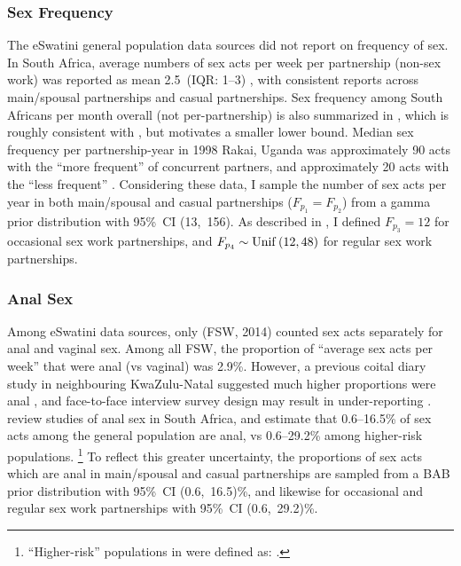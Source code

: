 \subsubsection{Sex Frequency}\label{model.par.sex.freq}
The eSwatini general population data sources \cite{SDHS2006,SHIMS1,SHIMS2}
did not report on frequency of sex. %
In South Africa, average numbers of sex acts per week per partnership (non-sex work)
was reported as mean 2.5~(IQR: 1--3) \cite{Delva2013},
with consistent reports across main/spousal partnerships and casual partnerships.
Sex frequency among South Africans per month overall (not per-partnership)
is also summarized in \cite[Figure~3.15]{Shisana2005},
which is roughly consistent with \cite{Delva2013}, but motivates a smaller lower bound.
Median sex frequency per partnership-year in 1998 Rakai, Uganda was
approximately 90 acts with the ``more frequent'' of concurrent partners, and
approximately 20 acts with the ``less frequent'' \cite{Morris2010}.
Considering these data,
I sample the number of sex acts per year in both main/spousal and casual partnerships
($F_{p_{1}} = F_{p_{2}}$) from a gamma prior distribution with 95\%~CI (13,~156).
As described in ,
I defined $F_{p_{3}} = 12$ for occasional sex work partnerships,
and $F_{p_{4}} \sim \operatorname{Unif}\,(12,48)$ for regular sex work partnerships.
\subsubsection{Anal Sex}\label{model.par.sex.anal}
Among eSwatini data sources, only \cite{EswKP2014} (FSW, 2014)
counted sex acts separately for anal and vaginal sex.
Among all FSW, the proportion of ``average sex acts per week'' that were anal (vs vaginal) was 2.9\%.
However, a previous coital diary study in neighbouring KwaZulu-Natal suggested
much higher proportions were anal \cite{Ramjee1999},
and face-to-face interview survey design may result in under-reporting \cite{Owen2020}.
\citet{Owen2017} review studies of anal sex in South Africa, and estimate that
0.6--16.5\% of sex acts among the general population are anal, vs
0.6--29.2\% among higher-risk populations.%
\footnote{``Higher-risk'' populations in \cite{Owen2017} were defined as:
  .}
To reflect this greater uncertainty, the proportions of sex acts which are anal
in main/spousal and casual partnerships are sampled
from a BAB prior distribution with 95\%~CI (0.6,~16.5)\%,
and likewise for occasional and regular sex work partnerships with 95\%~CI (0.6,~29.2)\%.
